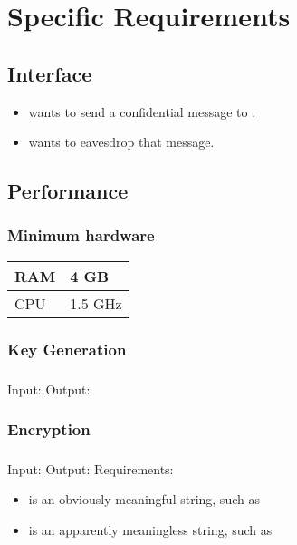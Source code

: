 \section{Specific Requirements}


\subsection{Interface}

\begin{frame}
\begin{itemize}
\item \alice{} wants to send a confidential message to \bob.
\item \eve{} wants to eavesdrop that message.
\end{itemize}
\end{frame}


\subsection{Performance}

\begin{frame}
\frametitle{Minimum hardware}
\begin{tabular}{l|l}
RAM & 4 GB \\ \hline
CPU & 1.5 GHz
\end{tabular}
\end{frame}

\subsubsection{Key Generation}

\begin{frame}
\frametitle{\bob}
Input: \generatekeysin \medskip
Output: \generatekeysout
\end{frame}

\subsubsection{Encryption}

\begin{frame}
\frametitle{\alice}
Input: \encryptin \medskip
Output: \encryptout \medskip
Requirements:
\begin{itemize}
\item \plaintextarg{} is an obviously meaningful string,
  such as \plaintextex
\item \ciphertextarg{} is an apparently meaningless string,
  such as \ciphertextex
\end{itemize}
\end{frame}

